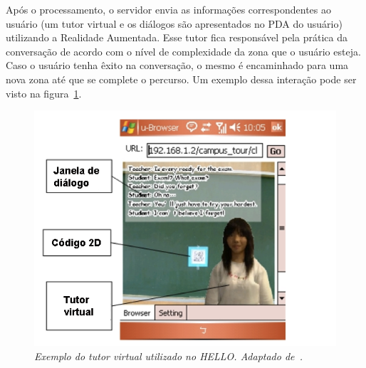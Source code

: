 	Após o processamento, o servidor envia as informações correspondentes ao usuário (um tutor virtual
	e os diálogos são apresentados no PDA do usuário) utilizando a Realidade Aumentada. Esse tutor fica
	responsável pela prática da conversação de acordo com o nível de complexidade da zona que o usuário
	esteja. Caso o usuário tenha êxito na conversação, o mesmo é encaminhado para uma nova zona até que
	se complete o percurso. Um exemplo dessa interação pode ser visto na figura~\ref{fig:hello}.
	
	\begin{figure}[htb]
		\centering \includegraphics[scale=.7]{figuras/cap2/hello.png}
		\caption{\textit{Exemplo do tutor virtual utilizado no HELLO. Adaptado de~\cite{tsung}.}}
		\label{fig:hello} 
	\end{figure}